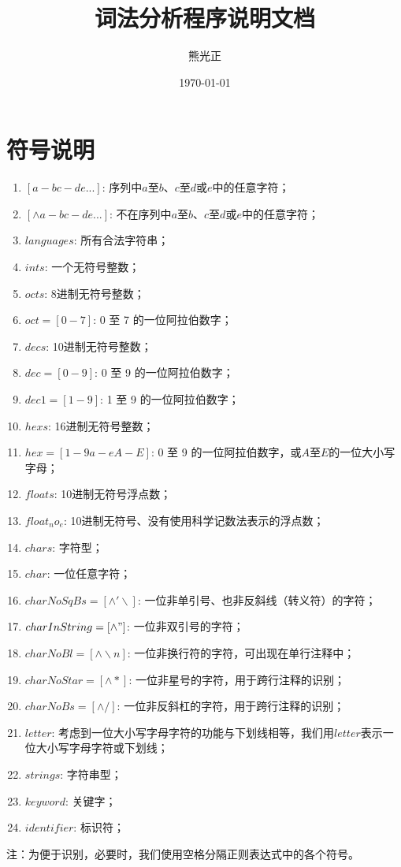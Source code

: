 \documentclass[UTF8]{ctexart}
\title{词法分析程序说明文档}
\author{熊光正}
\date{\today}
\begin{document}
\maketitle
\tableofcontents
\section{符号说明}
\begin{enumerate}
	\item $[a-bc-de...]$: 序列中$a$至$b$、$c$至$d$或$e$中的任意字符；
	\item $[\wedge a-bc-de...]$: 不在序列中$a$至$b$、$c$至$d$或$e$中的任意字符；
	\item $languages$: 所有合法字符串；
	\item $ints$: 一个无符号整数；
	\item $octs$: 8进制无符号整数；
	\item $oct = [0-7]$: 0 至 7 的一位阿拉伯数字；
	\item $decs$: 10进制无符号整数；
	\item $dec = [0-9]$: 0 至 9 的一位阿拉伯数字；
	\item $dec1 = [1-9]$: 1 至 9 的一位阿拉伯数字；
	\item $hexs$: 16进制无符号整数；
	\item $hex = [1-9a-eA-E]$: 0 至 9 的一位阿拉伯数字，或$A$至$E$的一位大小写字母；
	\item $floats$: 10进制无符号浮点数；
	\item $float_no_e$: 10进制无符号、没有使用科学记数法表示的浮点数；
	\item $chars$: 字符型；
	\item $char$: 一位任意字符；
	\item $charNoSqBs = [\wedge '\backslash]$: 一位非单引号、也非反斜线（转义符）的字符；
	\item $charInString = [\wedge "]$: 一位非双引号的字符；
	\item $charNoBl = [\wedge \backslash n]$: 一位非换行符的字符，可出现在单行注释中；
	\item $charNoStar = [\wedge *]$: 一位非星号的字符，用于跨行注释的识别；
	\item $charNoBs = [\wedge /]$: 一位非反斜杠的字符，用于跨行注释的识别；
	\item $letter$: 考虑到一位大小写字母字符的功能与下划线相等，我们用$letter$表示一位大小写字母字符或下划线；
	\item $strings$: 字符串型；
	\item $keyword$: 关键字；
	\item $identifier$: 标识符；
\end{enumerate}
注：为便于识别，必要时，我们使用空格分隔正则表达式中的各个符号。
\end{document}
